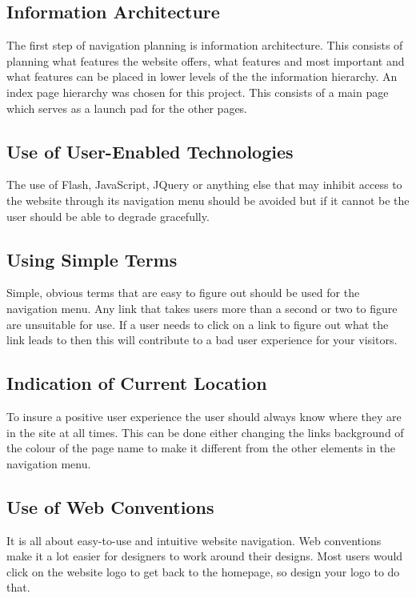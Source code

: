 \documentclass[a4paper, 12pt]{report}
\begin{document}
\subsection{Information Architecture}
The first step of navigation planning is information architecture\cite{IA_101}. This consists of planning what features the website offers, what features and most important and what features can be placed in lower levels of the the information hierarchy. 
An index page hierarchy was chosen for this project. This consists of a main page which serves as a launch pad for the other pages. 

\subsection{Use of User-Enabled Technologies}
The use of Flash, JavaScript, JQuery or anything else that may inhibit access to the website through its navigation menu should be avoided but if it cannot be the user should be able to degrade gracefully\cite{fallback_css_js}.

\subsection{Using Simple Terms}
Simple, obvious terms that are easy to figure out should be used for the navigation menu. Any link that takes users more than a second or two to figure are unsuitable for use. If a user needs to click on a link to figure out what the link leads to then this will contribute to a bad user experience for your visitors. 

\subsection{Indication of Current Location}
To insure a positive user experience the user should always know where they are in the site at all times. This can be done either changing the links background of the colour of the page name to make it different from the other elements in the navigation menu.

\subsection{Use of Web Conventions}
It is all about easy-to-use and intuitive website navigation. Web conventions make it a lot easier for designers to work around their designs. Most users would click on the website logo to get back to the homepage, so design your logo to do that.
\end{document}
